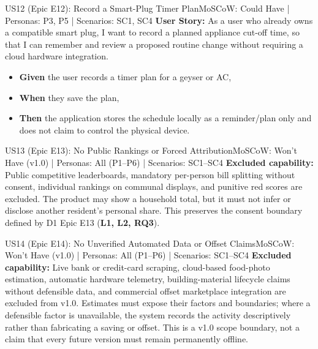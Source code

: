 \documentclass[12pt, a4paper]{article}
\begin{document}
\begin{storybox}{US12 (Epic E12): Record a Smart-Plug Timer Plan}{MoSCoW: Could Have | Personas: P3, P5 | Scenarios: SC1, SC4}
\textbf{User Story:} As a user who already owns a compatible smart plug, I want to record a planned appliance cut-off time, so that I can remember and review a proposed routine change without requiring a cloud hardware integration.
\begin{itemize}
    \item \textbf{Given} the user records a timer plan for a geyser or AC,
    \item \textbf{When} they save the plan,
    \item \textbf{Then} the application stores the schedule locally as a reminder/plan only and does not claim to control the physical device.
\end{itemize}
\end{storybox}

\begin{storybox}{US13 (Epic E13): No Public Rankings or Forced Attribution}{MoSCoW: Won't Have (v1.0) | Personas: All (P1--P6) | Scenarios: SC1--SC4}
\textbf{Excluded capability:} Public competitive leaderboards, mandatory per-person bill splitting without consent, individual rankings on communal displays, and punitive red scores are excluded. The product may show a household total, but it must not infer or disclose another resident's personal share. This preserves the consent boundary defined by D1 Epic E13 (\textbf{L1, L2, RQ3}).
\end{storybox}

\begin{storybox}{US14 (Epic E14): No Unverified Automated Data or Offset Claims}{MoSCoW: Won't Have (v1.0) | Personas: All (P1--P6) | Scenarios: SC1--SC4}
\textbf{Excluded capability:} Live bank or credit-card scraping, cloud-based food-photo estimation, automatic hardware telemetry, building-material lifecycle claims without defensible data, and commercial offset marketplace integration are excluded from v1.0. Estimates must expose their factors and boundaries; where a defensible factor is unavailable, the system records the activity descriptively rather than fabricating a saving or offset. This is a v1.0 scope boundary, not a claim that every future version must remain permanently offline.
\end{storybox}

\clearpage

\end{document}
